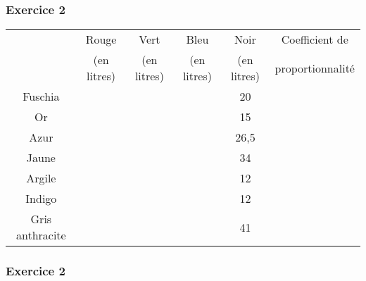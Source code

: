 \documentclass[a4paper,10pt]{beamer}
\begin{document}
{\small
\renewcommand{\arraystretch}{1.5}
\begin{frame}
	\frametitle{Exercice 2}

	\hspace*{-0.5cm}\begin{tabular}{|c|c|c|c|c|c|}
		\hline
		                & Rouge       & Vert        & Bleu        & Noir        & Coefficient de   \\
		                & (en litres) & (en litres) & (en litres) & (en litres) & proportionnalité \\ \hline
		Fuschia         &             &             &             & 20          &                  \\ \hline
		Or              &             &             &             & 15          &                  \\ \hline
		Azur            &             &             &             & 26,5        &                  \\ \hline
		Jaune           &             &             &             & 34          &                  \\ \hline
		Argile          &             &             &             & 12          &                  \\ \hline
		Indigo          &             &             &             & 12          &                  \\ \hline
		Gris anthracite &             &             &             & 41          &                  \\ \hline
	\end{tabular}
\end{frame}

\begin{frame}
	\frametitle{Exercice 2}


\end{frame}}
\end{document}
